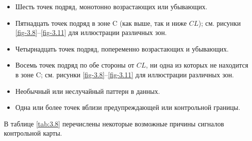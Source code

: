 \begin{itemize}
	\item Шесть точек подряд, монотонно возрастающих или убывающих.
	\item Пятнадцать точек подряд в зоне C (как выше, так и ниже \(CL\)); см. рисунки \ref{fig-3.8}–\ref{fig-3.11} для иллюстрации различных зон.
	\item Четырнадцать точек подряд, попеременно возрастающих и убывающих.
	\item Восемь точек подряд по обе стороны от \(CL\), ни одна из которых не находится в зоне C; см. рисунки \ref{fig-3.8}–\ref{fig-3.11} для иллюстрации различных зон.
	\item Необычный или неслучайный паттерн в данных.
	\item Одна или более точек вблизи предупреждающей или контрольной границы.
\end{itemize}

В таблице \ref{tab:3.8} перечислены некоторые возможные причины сигналов контрольной карты.


